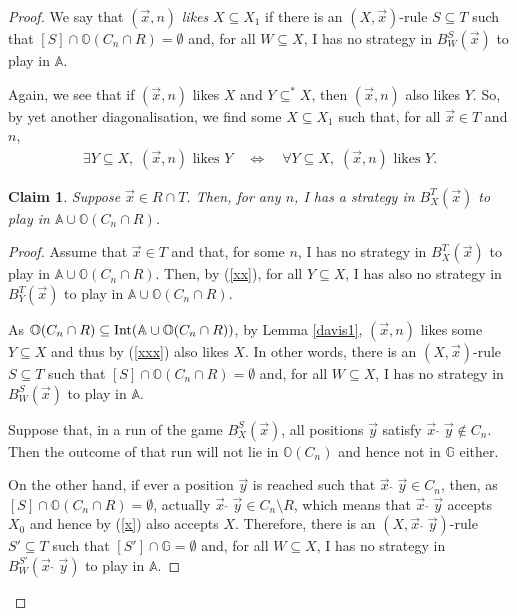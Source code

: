 \documentclass[10pt]{amsart}
\newcommand {\A}{\mathbb A}
\newcommand{\G}{\mathbb G}
\newcommand {\OO}{\mathbb O}
\newcommand{\con}{\;\hat{}\;}
\newcommand{\tom} {\emptyset}
\newcommand{\equi}{\Longleftrightarrow}
\newcommand {\e} {\exists}
\renewcommand {\a} {\forall}
\newtheorem{claim}[thm] {Claim}
\theoremstyle{definition}
\begin{document}
\begin{proof}
We say that $(\vec x,n)$ {\em likes} $X\subseteq X_1$ if there is an $(X,\vec x)$-rule $S\subseteq T$ such that $[S]\cap \OO(C_n\cap R)=\tom$ and, for all $W\subseteq X$, I has no strategy in $B^S_W(\vec x)$ to play in $\A$.

Again, we see that if $(\vec x,n)$ likes $X$ and $Y\subseteq^*X$, then $(\vec x,n)$ also likes $Y$. So, by yet another diagonalisation, we find some $X\subseteq X_1$ such that, for all $\vec x\in T$ and $n$,
\begin{equation}\label{xxx}\begin{split}
\e Y\subseteq X, \;(\vec x, n) \text{ likes }Y\quad
\equi\quad
\a Y\subseteq X, \;(\vec x, n) \text{ likes }Y.
\end{split}\end{equation}

\begin{claim}\label{xxxx}
Suppose  $\vec x\in R\cap T$. Then, for any $n$,  I has a strategy in $B^T_X(\vec x)$ to play in $\A\cup \OO(C_{n}\cap R)$.
\end{claim}

\begin{proof}Assume that $\vec x\in T$ and that, for some $n$, I has no strategy in $B^T_X(\vec x)$ to play in $\A\cup \OO(C_{n}\cap R)$. Then, by (\ref{xx}), for all $Y\subseteq X$, I has also no strategy in $B^T_Y(\vec x)$ to play in $\A\cup\OO(C_n\cap R)$. 

As $ \OO(C_{n}\cap R)\subseteq{\rm Int}(\A\cup \OO(C_{n}\cap R))$,  by Lemma \ref{davis1}, $(\vec x,n)$ likes some $Y\subseteq X$ and thus by (\ref{xxx}) also likes $X$. In other words, there is an $(X,\vec x)$-rule $S\subseteq T$
such that $[S]\cap\OO(C_{n}\cap R)=\tom$ and, for all $W\subseteq X$,  I has no strategy in $B^S_W(\vec x)$ to play in $\A$.

Suppose that, in a run of the game $B^S_X(\vec x)$,  all positions $\vec y$ satisfy $\vec x\con\vec y\notin C_{n}$. Then the outcome of that run will not lie in $\OO(C_n)$ and hence not in $\G$ either. 

On the other hand, if ever a position $\vec y$ is reached such that $\vec x\con \vec y\in C_{n}$, then, as $[S]\cap\OO(C_{n}\cap R)=\tom$, actually $\vec x\con \vec y\in C_{n}\setminus R$, which means that $\vec x\con \vec y$ accepts $X_0$ and hence by (\ref{x})  also accepts $X$. Therefore, there is an $(X,\vec x\con \vec y)$-rule $S'\subseteq T$ such that $[S']\cap \G=\tom$ and, for all $W\subseteq X$,  I has no strategy in $B^{S'}_W(\vec x\con \vec y)$ to play in $\A$. 


\end{proof}
\end{proof}
\end{document}
